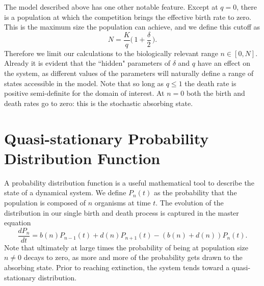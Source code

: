 \documentclass[a4paper,10pt]{article}
\numberwithin{equation}{section} %
\begin{document}
The model described above has one other notable feature. 
Except at $q=0$, there is a population at which the competition brings the effective birth rate to zero. 
This is the maximum size the population can achieve, and we define this cutoff as
\begin{equation}
N = \frac{K}{q}\Big(\,1 + \frac{\delta}{2}\,\Big).
\label{maxN}
\end{equation}
Therefore we limit our calculations to the biologically relevant range $n\in[0,N]$. %
Already it is evident that the ``hidden" parameters of $\delta$ and $q$ have an effect on the system, as different values of the parameters will naturally define a range of states accessible in the model. 
Note that so long as $q\leq 1$ the death rate is positive semi-definite for the domain of interest. %
At $n=0$ both the birth and death rates go to zero: this is the stochastic absorbing state. 



















\section{Quasi-stationary Probability Distribution Function}%

A probability distribution function is a useful mathematical tool to describe the state of a dynamical system.
We define $P_n(t)$ as the probability that the population is composed of $n$ organisms at time $t$.
The evolution of the distribution in our single birth and death process is captured in the master equation
\begin{equation}
\frac{dP_n}{dt} =  b(n)P_{n-1}(t) + d(n)P_{n+1}(t) - (b(n)+d(n))P_n(t).
\label{master-eqn}
\end{equation}
Note that ultimately at large times the probability of being at population size $n\neq 0$ decays to zero, as more and more of the probability gets drawn to the absorbing state.
Prior to reaching extinction, the system tends toward a quasi-stationary distribution. 
\end{document}
